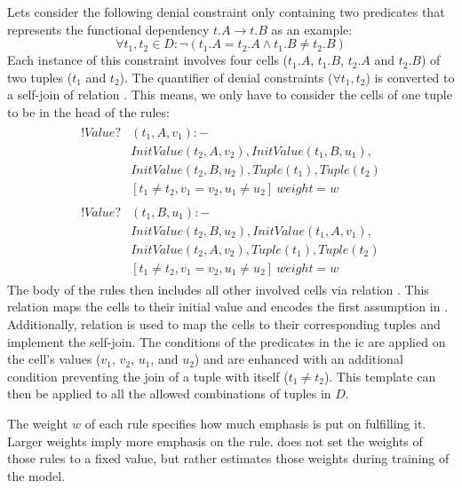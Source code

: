   Lets consider the following denial constraint only containing two predicates that represents the functional dependency $t.A \to t.B$ as an example:
  \begin{equation}
    \forall t_1, t_2 \in D: \neg(t_1.A = t_2.A \land t_1.B \neq t_2.B)
  \end{equation}
  Each instance of this constraint involves four cells ($t_1.A$, $t_1.B$, $t_2.A$ and $t_2.B$) of two tuples ($t_1$ and $t_2$).
  The quantifier of denial constraints ($\forall t_1, t_2$) is converted to a self-join of relation .
  This means, we only have to consider the cells of one tuple to be in the head of the rules:
  \begin{align}
    \begin{split}
      !Value?&(t_1,A,v_1):-\\
      &InitValue(t_2,A,v_2), InitValue(t_1,B,u_1),\\
      &InitValue(t_2,B,u_2), Tuple(t_1), Tuple(t_2)\\
      &[t_1 \neq t_2, v_1 = v_2, u_1 \neq u_2]\ weight=w%
    \end{split}\\
    \begin{split}
      !Value?&(t_1,B,u_1):-\\
      &InitValue(t_2,B,u_2), InitValue(t_1,A,v_1),\\
      &InitValue(t_2,A,v_2), Tuple(t_1), Tuple(t_2)\\
      &[t_1 \neq t_2, v_1 = v_2, u_1 \neq u_2]\ weight=w%
    \end{split}
  \end{align}
  The body of the rules then includes all other involved cells via relation .
  This relation maps the cells to their initial value and encodes the first assumption in \ddlog.
  Additionally, relation  is used to map the cells to their corresponding tuples and implement the self-join.
  The conditions of the predicates in the \gls{ic} are applied on the cell's values ($v_1$, $v_2$, $u_1$, and $u_2$) and are enhanced with an additional condition preventing the join of a tuple with itself ($t_1 \neq t_2$).
  This template can then be applied to all the allowed combinations of tuples in $D$.
  
  The weight $w$ of each rule specifies how much emphasis is put on fulfilling it.
  Larger weights imply more emphasis on the rule.
  \holoclean{} does not set the weights of those rules to a fixed value, but rather estimates those weights during training of the model.
  
